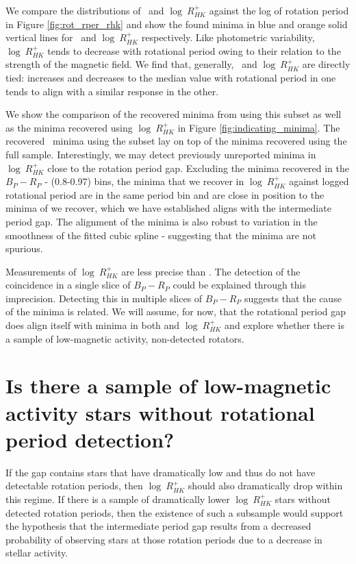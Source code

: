 We compare the distributions of \rper{} \ and $\log \ R^{+}_{HK}$ against the log of rotation period in Figure \ref{fig:rot_rper_rhk} and show the found minima in blue and orange solid vertical lines for \rper{} \ and $\log \ R^{+}_{HK}$ respectively.
Like photometric variability, $\log \ R^{+}_{HK}$ tends to decrease with rotational period owing to their relation to the strength of the magnetic field.
We find that, generally, \rper{} \ and $\log \ R^{+}_{HK}$ are directly tied: increases and decreases to the median value with rotational period in one tends to align with a similar response in the other.

We show the comparison of the recovered minima from \rper{} using this subset as well as the minima recovered using $\log \ R^{+}_{HK}$ in Figure \ref{fig:indicating_minima}.
The recovered \rper{} \ minima using the subset lay on top of the \rper{} minima recovered using the full sample.
Interestingly, we may detect previously unreported minima in $\log \ R^{+}_{HK}$ close to the rotation period gap.
Excluding the minima recovered in the $B_P-R_P$ - (0.8-0.97) bins, the minima that we recover in $\log \ R^{+}_{HK}$ against logged rotational period are in the same period bin and are close in position to the minima of \rper{} we recover, which we have established aligns with the intermediate period gap.
The alignment of the minima is also robust to variation in the smoothness of the fitted cubic spline - suggesting that the minima are not spurious.

Measurements of $\log \ R^{+}_{HK}$ are less precise than \rper{}.
The detection of the coincidence in a single slice of $B_P-R_P$ could be explained through this imprecision.
Detecting this in multiple slices of $B_P-R_P$ suggests that the cause of the minima is related.
We will assume, for now, that the rotational period gap does align itself with minima in both \rper{} and $\log \ R^{+}_{HK}$ and explore whether there is a sample of low-magnetic activity, non-detected rotators.

\section{Is there a sample of low-magnetic activity stars without rotational period detection?}
\label{sec:low_activity_gap}

If the gap contains stars that have dramatically low \rper{} and thus do not have detectable rotation periods, then $\log \ R^{+}_{HK}$ should also dramatically drop within this regime.
If there is a sample of dramatically lower $\log \ R^{+}_{HK}$ stars without detected rotation periods, then the existence of such a subsample would support the hypothesis that the intermediate period gap results from a decreased probability of observing stars at those rotation periods due to a decrease in stellar activity.

